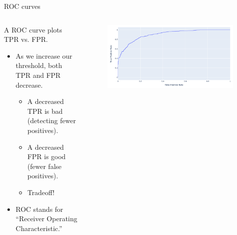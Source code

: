 \documentclass[aspectratio=169]{../latex_main/tntbeamer}  %
\begin{document}
	
	\begin{frame}{ROC curves}
	    \begin{columns}
	        \begin{column}{.5\textwidth}
    	        A ROC curve plots TPR vs. FPR.
	             \begin{itemize}
	                 \item As we increase our threshold, both TPR and FPR decrease.
	                 \begin{itemize}
	                     \item A decreased TPR is bad (detecting fewer positives).
	                     \item A decreased FPR is good (fewer false positives).
	                     \item Tradeoff!
	                 \end{itemize}
	             \end{itemize}
	             \begin{itemize}
	                 \item ROC stands for “Receiver Operating Characteristic.”
	             \end{itemize}
	        \end{column}
	        
	        
	        \begin{column}{.5\textwidth}
	                \begin{figure}
	                    \centering
	                    \includegraphics[scale=.55]{Bild27}
	                \end{figure}
	                
	                
	        \end{column}
	        
	    \end{columns}
	\end{frame}
	
\end{document}
